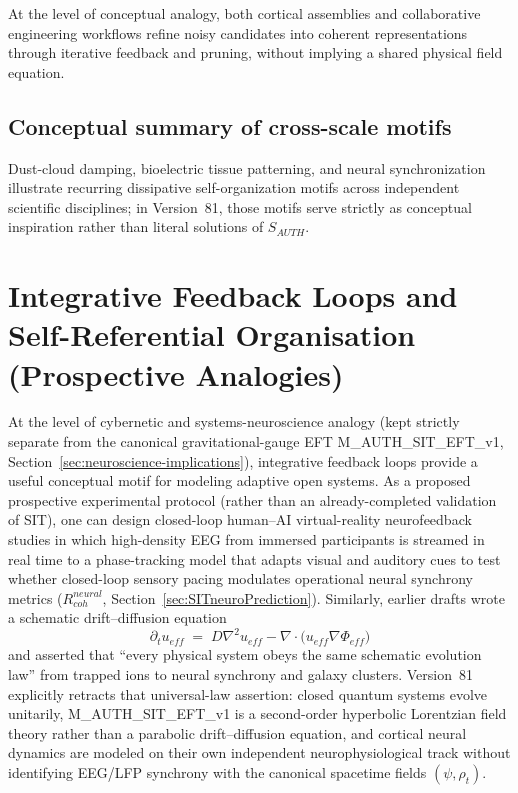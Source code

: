 \documentclass[american,11pt,letterpaper]{article}
\def\mathrm#1{#1}%
\def\texttt#1{#1}%
\def\emph#1{#1}%
\begin{document}
At the level of conceptual analogy, both cortical assemblies and collaborative engineering workflows refine noisy candidates into coherent representations through iterative feedback and pruning, without implying a shared physical field equation.

\subsection*{Conceptual summary of cross-scale motifs}

Dust-cloud damping, bioelectric tissue patterning, and neural synchronization illustrate recurring dissipative self-organization motifs across independent scientific disciplines; in Version~81, those motifs serve strictly as conceptual inspiration rather than literal solutions of $S_{\mathrm{AUTH}}$.

\section{Integrative Feedback Loops and Self-Referential Organisation (Prospective Analogies)}
\label{sec:integrative-feedback}

At the level of cybernetic and systems-neuroscience analogy (kept strictly separate from the canonical gravitational-gauge EFT \texttt{M\_AUTH\_SIT\_EFT\_v1}, Section~\ref{sec:neuroscience-implications}), integrative feedback loops provide a useful conceptual motif for modeling adaptive open systems. As a \emph{proposed prospective experimental protocol} (rather than an already-completed validation of SIT), one can design closed-loop human--AI virtual-reality neurofeedback studies in which high-density EEG from immersed participants is streamed in real time to a phase-tracking model that adapts visual and auditory cues to test whether closed-loop sensory pacing modulates operational neural synchrony metrics ($R_{\mathrm{coh}}^{\mathrm{neural}}$, Section~\ref{sec:SITneuroPrediction}). Similarly, earlier drafts wrote a schematic drift--diffusion equation
\[
\partial_t u_{\mathrm{eff}}
   \;=\;
   D\nabla^{2} u_{\mathrm{eff}}
   - \nabla\!\cdot\!\bigl(u_{\mathrm{eff}}\nabla\Phi_{\mathrm{eff}}\bigr)
\]
and asserted that ``every physical system obeys the same schematic evolution law'' from trapped ions to neural synchrony and galaxy clusters. Version~81 explicitly \emph{retracts} that universal-law assertion: closed quantum systems evolve unitarily, \texttt{M\_AUTH\_SIT\_EFT\_v1} is a second-order hyperbolic Lorentzian field theory rather than a parabolic drift--diffusion equation, and cortical neural dynamics are modeled on their own independent neurophysiological track without identifying EEG/LFP synchrony with the canonical spacetime fields $(\psi, \rho_t)$.
\end{document}
